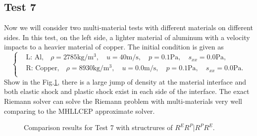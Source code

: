 \documentclass{article}
\numberwithin{equation}{section}
\numberwithin{table}{section}
\begin{document}
\subsection{Test 7}
Now we will consider two multi-material tests with different materials on different sides. In this test, on the left side, a lighter material of aluminum with a velocity impacts to a heavier material of copper. The initial condition is given as
\begin{equation}
 \left\{ \begin{aligned}
	 &	 \text{L: Al,}\quad  \rho = 2785 \text{kg}/\text{m}^3, \quad  u = 40\text{m}/\text{s}, \quad  p = 0.1\text{Pa}, \quad  s_{xx}=0.0\text{Pa},\\
	 &	 \text{R: Copper,}\quad  \rho = 8930\text{kg}/\text{m}^3, \quad  u = 0.0\text{m}/\text{s}, \quad  p =0.1\text{Pa}, \quad  s_{xx}=0.0\text{Pa}.\\
   \end{aligned}
 \right.
\end{equation}
Show in the Fig.\ref{fig:case7}, there is a large jump of density at the material interface and  both elastic shock and plastic shock exist in each side of the interface. The exact Riemann solver can solve the Riemann problem with multi-materials very well comparing to the MHLLCEP approximate solver.

\begin{figure}
  \centering

    \caption{Comparison results for Test 7 with structrures of $R^ER^P|R^PR^E$.  }
  \label{fig:case7}
\end{figure}

%
%
\end{document}
